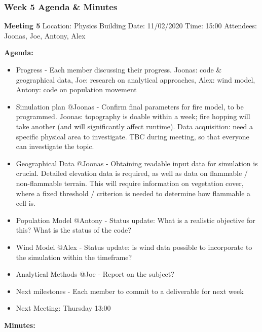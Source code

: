 \subsubsection*{Week 5 Agenda \& Minutes}
\textbf{Meeting 5}\newline
Location: Physics Building\newline
Date: 11/02/2020\newline
Time: 15:00\newline
Attendees: Joonas, Joe, Antony, Alex

\noindent\textbf{Agenda:}
\begin{itemize}
    \item Progress - Each member discussing their progress. Joonas: code \& geographical data, Joe: research on analytical approaches, Alex: wind model, Antony: code on population movement
    \item Simulation plan @Joonas - Confirm final parameters for fire model, to be programmed. Joonas: topography is doable within a week; fire hopping will take another (and will significantly affect runtime).
    Data acquisition: need a specific physical area to investigate. TBC during meeting, so that everyone can investigate the topic.
    \item Geographical Data @Joonas - Obtaining readable input data for simulation is crucial. Detailed elevation data is required, as well as data on flammable / non-flammable terrain. This will require information on vegetation cover, where a fixed threshold / criterion is needed to determine how flammable a cell is.
    \item Population Model @Antony - Status update: What is a realistic objective for this? What is the status of the code?
    \item Wind Model @Alex - Status update: is wind data possible to incorporate to the simulation within the timeframe?
    \item Analytical Methods @Joe - Report on the subject?
    \item Next milestones - Each member to commit to a deliverable for next week
    \item Next Meeting: Thursday 13:00
\end{itemize}
\textbf{Minutes:}

